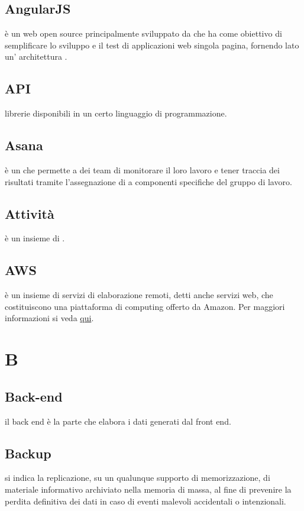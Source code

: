\documentclass[12pt,a4paper]{article}
\begin{document}
\subsection{AngularJS}
è un  web open source principalmente sviluppato da  che ha come obiettivo di semplificare lo sviluppo e il test di applicazioni web singola pagina, fornendo lato  un' architettura .

\subsection{API}
librerie  disponibili in un certo linguaggio di programmazione.

\subsection{Asana}
è un  che permette a dei team di monitorare il loro lavoro e tener traccia dei risultati tramite l'assegnazione di  a componenti specifiche del gruppo di lavoro.

\subsection{Attività}
è un insieme di .

\subsection{AWS}
è un insieme di servizi di elaborazione remoti, detti anche servizi web, che costituiscono una piattaforma di computing offerto da Amazon. Per maggiori informazioni si veda \href{https://aws.amazon.com/it/}{qui}.


\newpage

\section{B}

\subsection{Back-end}
il back end è la parte che elabora i dati generati dal front end.

\subsection{Backup}
si indica la replicazione, su un qualunque supporto di memorizzazione, di materiale informativo archiviato nella memoria di massa, al fine di prevenire la perdita definitiva dei dati in caso di eventi malevoli accidentali o intenzionali.
\end{document}
